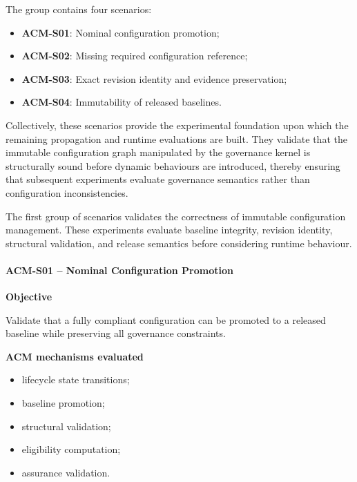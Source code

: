 \documentclass[10pt]{article}
\begin{document}
The group contains four scenarios:

\begin{itemize}
    \item \textbf{ACM-S01}: Nominal configuration promotion;
    \item \textbf{ACM-S02}: Missing required configuration reference;
    \item \textbf{ACM-S03}: Exact revision identity and evidence preservation;
    \item \textbf{ACM-S04}: Immutability of released baselines.
\end{itemize}

Collectively, these scenarios provide the experimental foundation upon which
the remaining propagation and runtime evaluations are built. They validate that
the immutable configuration graph manipulated by the governance kernel is
structurally sound before dynamic behaviours are introduced, thereby ensuring
that subsequent experiments evaluate governance semantics rather than
configuration inconsistencies.
\label{app:scenario_group_a}

The first group of scenarios validates the correctness of immutable
configuration management. These experiments evaluate baseline integrity,
revision identity, structural validation, and release semantics before
considering runtime behaviour.

\paragraph{ACM-S01 -- Nominal Configuration Promotion}

\textbf{Objective}

Validate that a fully compliant configuration can be promoted to a released
baseline while preserving all governance constraints.

\textbf{ACM mechanisms evaluated}

\begin{itemize}
\item lifecycle state transitions;
\item baseline promotion;
\item structural validation;
\item eligibility computation;
\item assurance validation.
\end{itemize}
\end{document}
